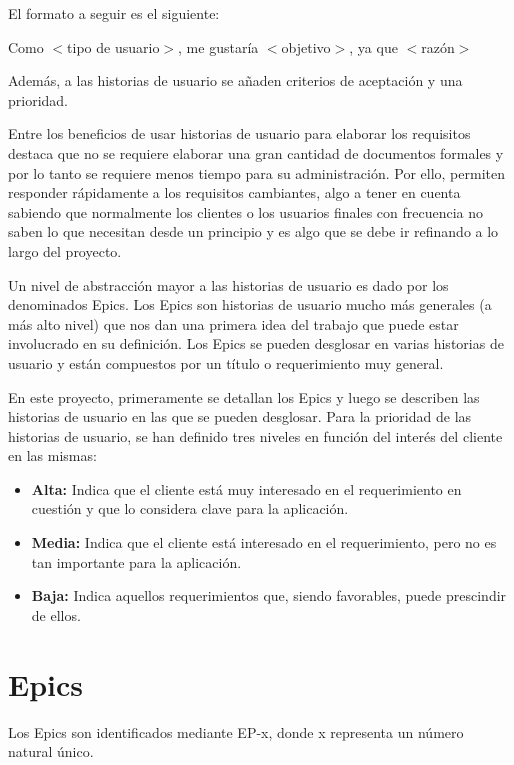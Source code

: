 El formato a seguir es el siguiente:

\begin{center}
Como $<$tipo de usuario$>$, me gustaría $<$objetivo$>$, ya que $<$razón$>$
\end{center}

Además, a las historias de usuario se añaden criterios de aceptación y una prioridad.

Entre los beneficios de usar historias de usuario para elaborar los requisitos destaca que no se requiere elaborar una gran cantidad de documentos formales y por lo tanto se requiere menos tiempo para su administración. Por ello, permiten responder rápidamente a los requisitos cambiantes, algo a tener en cuenta sabiendo que normalmente los clientes o los usuarios finales con frecuencia no saben lo que necesitan desde un principio y es algo que se debe ir refinando a lo largo del proyecto.

Un nivel de abstracción mayor a las historias de usuario es dado por los denominados Epics. Los Epics son historias de usuario mucho más generales (a más alto nivel) que nos dan una primera idea del trabajo que puede estar involucrado en su definición. Los Epics se pueden desglosar en varias historias de usuario y están compuestos por un título o requerimiento muy general.

En este proyecto, primeramente se detallan los Epics y luego se describen las historias de usuario en las que se pueden desglosar. Para la prioridad de las historias de usuario, se han definido tres niveles en función del interés del cliente en las mismas:

\begin{itemize}
\item \textbf{Alta:} Indica que el cliente está muy interesado en el requerimiento en cuestión y que lo considera clave para la aplicación.
\item \textbf{Media:} Indica que el cliente está interesado en el requerimiento, pero no es tan importante para la aplicación. 
\item \textbf{Baja:} Indica aquellos requerimientos que, siendo favorables, puede prescindir de ellos.
\end{itemize}


\section{Epics} \label{epics}
Los Epics son identificados mediante EP-x, donde x representa un número natural único.

